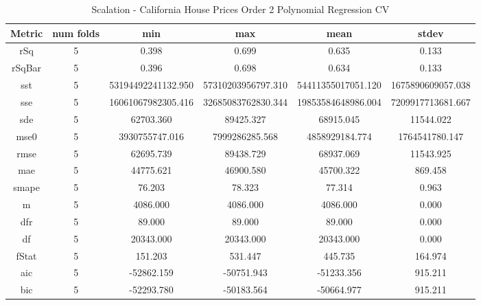 \documentclass{article}
\begin{document}
\begin{table}[H]
\centering
\caption{Scalation - California House Prices Order 2 Polynomial Regression CV}
\label{tab:Scalation - House Prices Order 2 Polynomial Regression CV}
\begin{tabular}{|c|c|c|c|c|c|}\hline
Metric & num folds & min & max & mean & stdev \\ \hline \hline
rSq & 5 & 0.398 & 0.699 & 0.635 & 0.133 \\ \hline
rSqBar & 5 & 0.396 & 0.698 & 0.634 & 0.133 \\ \hline
sst & 5 & 53194492241132.950 & 57310203956797.310 & 54411355017051.120 & 1675890609057.038 \\ \hline
sse & 5 & 16061067982305.416 & 32685083762830.344 & 19853584648986.004 & 7209917713681.667 \\ \hline
sde & 5 & 62703.360 & 89425.327 & 68915.045 & 11544.022 \\ \hline
mse0 & 5 & 3930755747.016 & 7999286285.568 & 4858929184.774 & 1764541780.147 \\ \hline
rmse & 5 & 62695.739 & 89438.729 & 68937.069 & 11543.925 \\ \hline
mae & 5 & 44775.621 & 46900.580 & 45700.322 & 869.458 \\ \hline
smape & 5 & 76.203 & 78.323 & 77.314 & 0.963 \\ \hline
m & 5 & 4086.000 & 4086.000 & 4086.000 & 0.000 \\ \hline
dfr & 5 & 89.000 & 89.000 & 89.000 & 0.000 \\ \hline
df & 5 & 20343.000 & 20343.000 & 20343.000 & 0.000 \\ \hline
fStat & 5 & 151.203 & 531.447 & 445.735 & 164.974 \\ \hline
aic & 5 & -52862.159 & -50751.943 & -51233.356 & 915.211 \\ \hline
bic & 5 & -52293.780 & -50183.564 & -50664.977 & 915.211 \\ \hline
\end{tabular}
\end{table}
\end{document}
